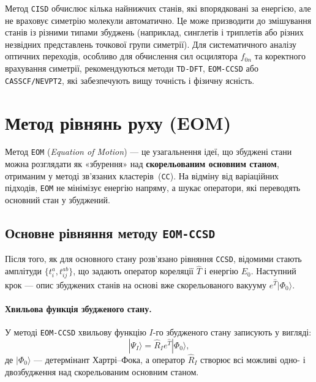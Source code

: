 \begin{commentbox}[Зауваження]
    Метод \texttt{CISD} обчислює кілька найнижчих станів, які впорядковані за енергією, але не враховує симетрію молекули автоматично. Це може призводити до змішування станів із різними типами збуджень (наприклад, синглетів і триплетів або різних незвідних представлень точкової групи симетрії). Для систематичного аналізу оптичних переходів, особливо для обчислення сил осцилятора \(f_{0n}\) та коректного врахування симетрії, рекомендуються методи \texttt{TD-DFT}, \texttt{EOM-CCSD} або \texttt{CASSCF/NEVPT2}, які забезпечують вищу точність і фізичну ясність.
\end{commentbox}


\section{Метод рівнянь руху (EOM)}

Метод \texttt{EOM} (\emph{Equation of Motion}) --- це узагальнення ідеї, що збуджені стани можна розглядати
як «збурення» над \textbf{скорельованим основним станом}, отриманим у методі зв’язаних кластерів~(\texttt{CC}).
На відміну від варіаційних підходів, \texttt{EOM} не мінімізує енергію напряму,
а шукає оператори, які переводять основний стан у збуджений.

\subsection{Основне рівняння методу \texttt{EOM-CCSD}}

Після того, як для основного стану розв’язано рівняння \texttt{CCSD},
відомими стають амплітуди \(\{t_i^a, t_{ij}^{ab}\}\),
що задають оператор кореляції \(\hat{T}\) і енергію \(E_0\).
Наступний крок --- опис збуджених станів на основі вже скорельованого
вакууму \(e^{\hat{T}}|\Phi_0\rangle\).

\paragraph{Хвильова функція збудженого стану.}
У методі \texttt{EOM-CCSD} хвильову функцію \(I\)-го збудженого стану
записують у вигляді:
\[
    |\Psi_I\rangle = \hat{R}_I e^{\hat{T}}|\Phi_0\rangle,
\]
де \(|\Phi_0\rangle\) --- детермінант Хартрі–Фока,
а оператор \(\hat{R}_I\) створює всі можливі одно- і двозбудження
над скорельованим основним станом.

